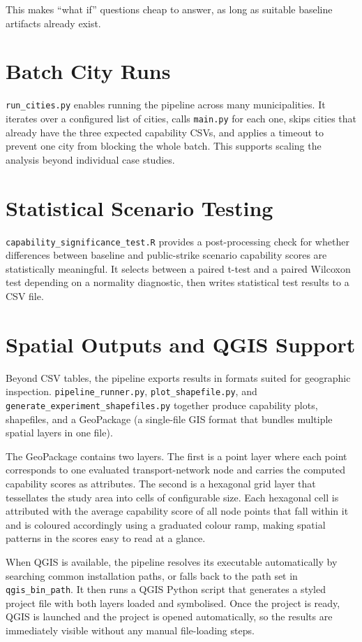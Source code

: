 \documentclass[11pt]{article}
\begin{document}
This makes ``what if'' questions cheap to answer, as long as suitable baseline artifacts already exist.

\section{Batch City Runs}

\texttt{run\_cities.py} enables running the pipeline across many municipalities. It iterates over a configured list of cities, calls \texttt{main.py} for each one, skips cities that already have the three expected capability CSVs, and applies a timeout to prevent one city from blocking the whole batch. This supports scaling the analysis beyond individual case studies.

\section{Statistical Scenario Testing}

\texttt{capability\_significance\_test.R} provides a post-processing check for whether differences between baseline and public-strike scenario capability scores are statistically meaningful. It selects between a paired t-test and a paired Wilcoxon test depending on a normality diagnostic, then writes statistical test results to a CSV file.

\section{Spatial Outputs and QGIS Support}

Beyond CSV tables, the pipeline exports results in formats suited for geographic inspection. \texttt{pipeline\_runner.py}, \texttt{plot\_shapefile.py}, and \texttt{generate\_experiment\_shapefiles.py} together produce capability plots, shapefiles, and a GeoPackage (a single-file GIS format that bundles multiple spatial layers in one file).

The GeoPackage contains two layers. The first is a point layer where each point corresponds to one evaluated transport-network node and carries the computed capability scores as attributes. The second is a hexagonal grid layer that tessellates the study area into cells of configurable size. Each hexagonal cell is attributed with the average capability score of all node points that fall within it and is coloured accordingly using a graduated colour ramp, making spatial patterns in the scores easy to read at a glance.

When QGIS is available, the pipeline resolves its executable automatically by searching common installation paths, or falls back to the path set in \texttt{qgis\_bin\_path}. It then runs a QGIS Python script that generates a styled project file with both layers loaded and symbolised. Once the project is ready, QGIS is launched and the project is opened automatically, so the results are immediately visible without any manual file-loading steps.
\end{document}
